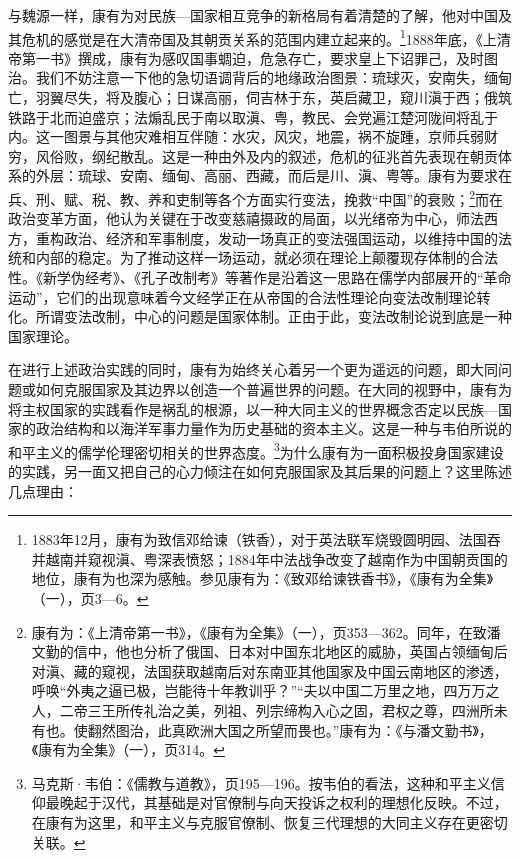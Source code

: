 \documentclass[a4paper, 12pt, openright]{ctexbook}
\begin{document}
与魏源一样，康有为对民族—国家相互竞争的新格局有着清楚的了解，他对中国及其危机的感觉是在大清帝国及其朝贡关系的范围内建立起来的。\footnote{1883年12月，康有为致信邓给谏（铁香），对于英法联军烧毁圆明园、法国吞并越南并窥视滇、粤深表愤怒；1884年中法战争改变了越南作为中国朝贡国的地位，康有为也深为感触。参见康有为：《致邓给谏铁香书》，《康有为全集》（一），页3—6。}1888年底，《上清帝第一书》撰成，康有为感叹国事蜩迫，危急存亡，要求皇上下诏罪己，及时图治。我们不妨注意一下他的急切语调背后的地缘政治图景：琉球灭，安南失，缅甸亡，羽翼尽失，将及腹心；日谋高丽，伺吉林于东，英启藏卫，窥川滇于西；俄筑铁路于北而迫盛京；法煽乱民于南以取滇、粤，教民、会党遍江楚河陇间将乱于内。这一图景与其他灾难相互伴随：水灾，风灾，地震，祸不旋踵，京师兵弱财穷，风俗败，纲纪散乱。这是一种由外及内的叙述，危机的征兆首先表现在朝贡体系的外层：琉球、安南、缅甸、高丽、西藏，而后是川、滇、粤等。康有为要求在兵、刑、赋、税、教、养和吏制等各个方面实行变法，挽救“中国”的衰败；\footnote{康有为：《上清帝第一书》，《康有为全集》（一），页353—362。同年，在致潘文勤的信中，他也分析了俄国、日本对中国东北地区的威胁，英国占领缅甸后对滇、藏的窥视，法国获取越南后对东南亚其他国家及中国云南地区的渗透，呼唤“外夷之逼已极，岂能待十年教训乎？”“夫以中国二万里之地，四万万之人，二帝三王所传礼治之美，列祖、列宗缔构入心之固，君权之尊，四洲所未有也。使翻然图治，此真欧洲大国之所望而畏也。”康有为：《与潘文勤书》，《康有为全集》（一），页314。}而在政治变革方面，他认为关键在于改变慈禧摄政的局面，以光绪帝为中心，师法西方，重构政治、经济和军事制度，发动一场真正的变法强国运动，以维持中国的法统和内部的稳定。为了推动这样一场运动，就必须在理论上颠覆现存体制的合法性。《新学伪经考》、《孔子改制考》等著作是沿着这一思路在儒学内部展开的“革命运动”，它们的出现意味着今文经学正在从帝国的合法性理论向变法改制理论转化。所谓变法改制，中心的问题是国家体制。正由于此，变法改制论说到底是一种国家理论。

在进行上述政治实践的同时，康有为始终关心着另一个更为遥远的问题，即大同问题或如何克服国家及其边界以创造一个普遍世界的问题。在大同的视野中，康有为将主权国家的实践看作是祸乱的根源，以一种大同主义的世界概念否定以民族—国家的政治结构和以海洋军事力量作为历史基础的资本主义。这是一种与韦伯所说的和平主义的儒学伦理密切相关的世界态度。\footnote{马克斯·韦伯：《儒教与道教》，页195—196。按韦伯的看法，这种和平主义信仰最晚起于汉代，其基础是对官僚制与向天投诉之权利的理想化反映。不过，在康有为这里，和平主义与克服官僚制、恢复三代理想的大同主义存在更密切关联。}为什么康有为一面积极投身国家建设的实践，另一面又把自己的心力倾注在如何克服国家及其后果的问题上？这里陈述几点理由：
\end{document}
